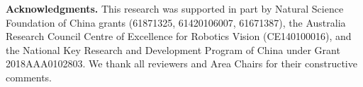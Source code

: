 \documentclass[10pt,twocolumn,letterpaper]{article}
\begin{document}
\vspace{-5pt}
\small{\vspace{.1in}\noindent\textbf{Acknowledgments.}\quad
This research was supported in part by Natural  Science  Foundation  of  China  grants  (61871325, 61420106007, 61671387), the Australia Research Council Centre of Excellence for Robotics Vision (CE140100016), and the National Key Research and Development Program of China under Grant 2018AAA0102803. We thank all reviewers and Area Chairs for their constructive comments.}

{\small


}
\end{document}
